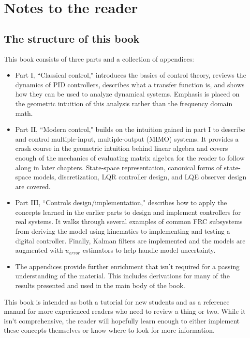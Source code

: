 
\setcounter{chapter}{-1}
\chapter{Notes to the reader}

\section{The structure of this book}

This book consists of three parts and a collection of appendices:

\begin{itemize}
  \item Part I, ``Classical control," introduces the basics of control theory,
    reviews the dynamics of PID controllers, describes what a transfer function
    is, and shows how they can be used to analyze dynamical systems. Emphasis is
    placed on the geometric intuition of this analysis rather than the frequency
    domain math.
  \item Part II, ``Modern control," builds on the intuition gained in part I to
    describe and control multiple-input, multiple-output (MIMO) systems. It
    provides a crash course in the geometric intuition behind linear algebra and
    covers enough of the mechanics of evaluating matrix algebra for the reader
    to follow along in later chapters. State-space representation, canonical
    forms of state-space models, discretization, LQR controller design, and LQE
    observer design are covered.
  \item Part III, ``Controls design/implementation," describes how to apply the
    concepts learned in the earlier parts to design and implement controllers
    for real systems. It walks through several examples of common FRC subsystems
    from deriving the model using kinematics to implementing and testing a
    digital controller. Finally, Kalman filters are implemented and the models
    are augmented with $u_{error}$ estimators to help handle model uncertainty.
  \item The appendices provide further enrichment that isn't required for a
    passing understanding of the material. This includes derivations for many of
    the results presented and used in the main body of the book.
\end{itemize}

This book is intended as both a tutorial for new students and as a reference
manual for more experienced readers who need to review a thing or two. While it
isn't comprehensive, the reader will hopefully learn enough to either implement
these concepts themselves or know where to look for more information.

